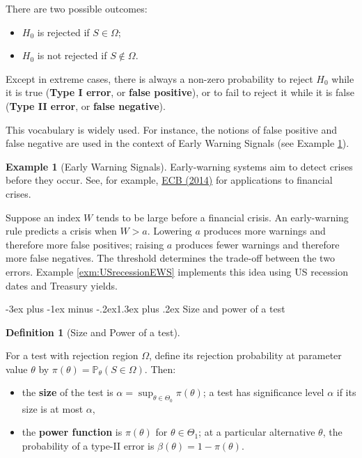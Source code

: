 \documentclass[
  11pt,
]{book}
\makeatletter
\providecommand{\tightlist}{%
  \setlength{\itemsep}{0pt}\setlength{\parskip}{0pt}}
\renewcommand\section{\@startsection{section}{1}{\z@}
  {-3ex plus -1ex minus -.2ex}{1.3ex plus .2ex}
  {\normalfont\Large\bfseries\color{TextbookInk}}}
\theoremstyle{definition}
\newtheorem{definition}{Definition}[chapter]
\theoremstyle{definition}
\newtheorem{example}{Example}[chapter]
\theoremstyle{definition}
\theoremstyle{definition}
\theoremstyle{remark}
\makeatother
\begin{document}
There are two possible outcomes:

\begin{itemize}
\tightlist
\item
  \(H_0\) is rejected if \(S \in \Omega\);
\item
  \(H_0\) is not rejected if \(S \not\in \Omega\).
\end{itemize}

Except in extreme cases, there is always a non-zero probability to reject \(H_0\) while it is true (\textbf{Type I error}, or \textbf{false positive}), or to fail to reject it while it is false (\textbf{Type II error}, or \textbf{false negative}).

This vocabulary is widely used. For instance, the notions of false positive and false negative are used in the context of Early Warning Signals (see Example \ref{exm:FPFN}).

\begin{example}[Early Warning Signals]
\protect\hypertarget{exm:FPFN}{}\label{exm:FPFN}Early-warning systems aim to detect crises before they occur. See, for example, \href{http://www.ecb.europa.eu/events/pdf/conferences/140623/Vasicek-et-al_Comparing-Different-Early-Warning-Systems.pdf?F96bbb525a26071ecf97f9154fb3cc73}{ECB (2014)} for applications to financial crises.

Suppose an index \(W\) tends to be large before a financial crisis. An early-warning rule predicts a crisis when \(W>a\). Lowering \(a\) produces more warnings and therefore more false positives; raising \(a\) produces fewer warnings and therefore more false negatives. The threshold determines the trade-off between the two errors. Example \ref{exm:USrecessionEWS} implements this idea using US recession dates and Treasury yields.
\end{example}

\section{Size and power of a test}\label{size-power}

\begin{definition}[Size and Power of a test]
\protect\hypertarget{def:sizepower}{}\label{def:sizepower}

For a test with rejection region \(\Omega\), define its rejection probability at parameter value \(\theta\) by \(\pi(\theta)=\mathbb{P}_\theta(S\in\Omega)\). Then:

\begin{itemize}
\tightlist
\item
  the \textbf{size} of the test is \(\alpha=\sup_{\theta\in\Theta_0}\pi(\theta)\); a test has significance level \(\alpha\) if its size is at most \(\alpha\),
\item
  the \textbf{power function} is \(\pi(\theta)\) for \(\theta\in\Theta_1\); at a particular alternative \(\theta\), the probability of a type-II error is \(\beta(\theta)=1-\pi(\theta)\).
\end{itemize}

\end{definition}
\end{document}
